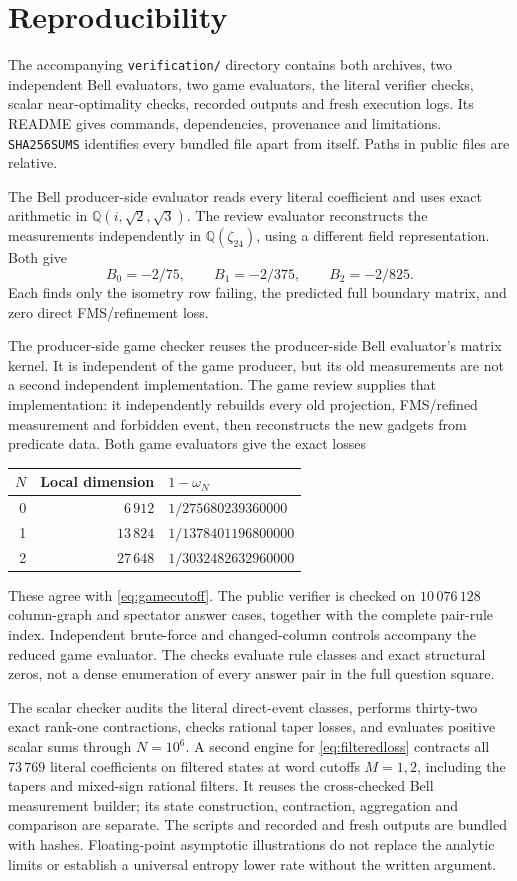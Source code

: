 \section{Reproducibility}\label{sec:repro}
The accompanying \texttt{verification/} directory contains both archives, two independent Bell evaluators, two game evaluators, the literal verifier checks, scalar near-optimality checks, recorded outputs and fresh execution logs. Its README gives commands, dependencies, provenance and limitations. \texttt{SHA256SUMS} identifies every bundled file apart from itself. Paths in public files are relative.

The Bell producer-side evaluator reads every literal coefficient and uses exact arithmetic in $\mathbb Q(i,\sqrt2,\sqrt3)$. The review evaluator reconstructs the measurements independently in $\mathbb Q(\zeta_{24})$, using a different field representation. Both give
\[
 B_0=-2/75,\qquad B_1=-2/375,\qquad B_2=-2/825.
\]
Each finds only the isometry row failing, the predicted full boundary matrix, and zero direct FMS/refinement loss.

The producer-side game checker reuses the producer-side Bell evaluator's matrix kernel. It is independent of the game producer, but its old measurements are not a second independent implementation. The game review supplies that implementation: it independently rebuilds every old projection, FMS/refined measurement and forbidden event, then reconstructs the new gadgets from predicate data. Both game evaluators give the exact losses
\begin{center}
\begin{tabular}{rrl}
\toprule
$N$&Local dimension&$1-\omega_N$\\
\midrule
0&$6\,912$&$1/275680239360000$\\
1&$13\,824$&$1/1378401196800000$\\
2&$27\,648$&$1/3032482632960000$\\
\bottomrule
\end{tabular}
\end{center}
These agree with \eqref{eq:gamecutoff}. The public verifier is checked on $10\,076\,128$ column-graph and spectator answer cases, together with the complete pair-rule index. Independent brute-force and changed-column controls accompany the reduced game evaluator. The checks evaluate rule classes and exact structural zeros, not a dense enumeration of every answer pair in the full question square.

The scalar checker audits the literal direct-event classes, performs thirty-two exact rank-one contractions, checks rational taper losses, and evaluates positive scalar sums through $N=10^6$. A second engine for \eqref{eq:filteredloss} contracts all $73\,769$ literal coefficients on filtered states at word cutoffs $M=1,2$, including the tapers and mixed-sign rational filters. It reuses the cross-checked Bell measurement builder; its state construction, contraction, aggregation and comparison are separate. The scripts and recorded and fresh outputs are bundled with hashes. Floating-point asymptotic illustrations do not replace the analytic limits or establish a universal entropy lower rate without the written argument.

